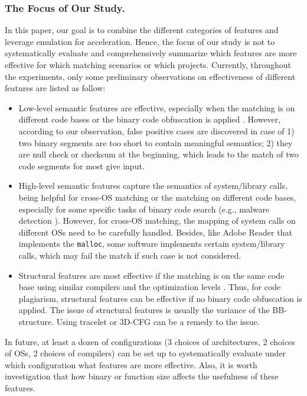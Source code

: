 \subsubsection{The Focus of Our Study.}
In this paper, our goal is to combine the different categories of features and leverage emulation for acceleration. Hence, the focus of our study is not to systematically evaluate and comprehensively summarize which features are more effective for which matching scenarios or which projects. Currently, throughout the experiments, only some preliminary observations on effectiveness of different features are listed as follow:
\begin{itemize}[itemsep=0.15mm]
\item Low-level semantic features are effective, especially when the matching is on different code bases or the binary code obfuscation is applied \cite{luo2014semantics}. However, according to our observation, false positive cases are discovered in case of 1)  two binary segments are too short to contain meaningful semantics; 2) they are null check or checksum at the beginning, which leads to the match of two code segments for most give input.
\item High-level semantic features capture the semantics of system/library calls, being helpful for cross-OS matching or the matching on different code bases, especially for some specific tasks of binary code search (e.g., malware detection \cite{DBLP:conf/issta/CanaliLBKCK12}).  However, for cross-OS matching, the mapping of system calls on different OSs need to be carefully handled. Besides, like Adobe Reader that implements the \texttt{malloc}, some software implements certain system/library calls, which may fail the match if such case is not considered.
\item Structural features are most effective if the matching is on the same code base using similar compilers and the optimization levels \cite{DBLP:conf/pldi/DavidY14,DBLP:conf/pldi/DavidPY16}. Thus, for code plagiarism, structural features can be effective if no binary code obfuscation is applied. The issue of structural features is usually the variance of the BB-structure. Using tracelet or 3D-CFG can be a remedy to the issue.
\end{itemize}

In future, at least a dozen of configurations (3 choices of architectures, 2 choices of OSs, 2 choices of compilers) can be set up to systematically evaluate under which configuration what features are more effective. Also, it is worth investigation that how binary or function size affects the usefulness of these features.
